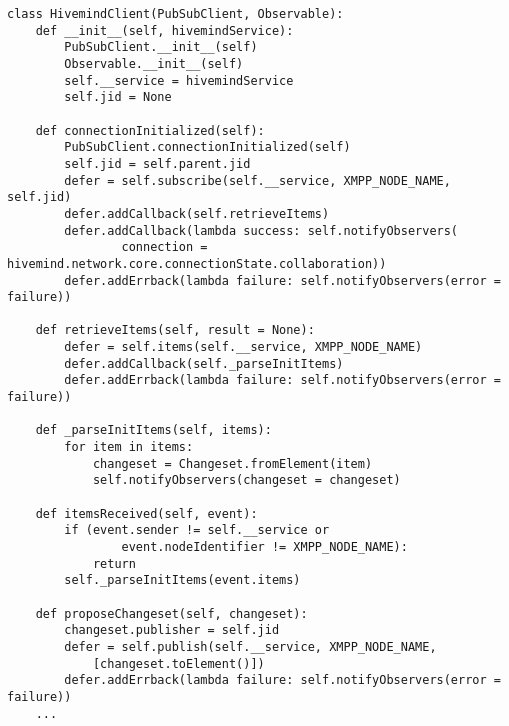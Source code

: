 \begin{lstlisting}
class HivemindClient(PubSubClient, Observable):
    def __init__(self, hivemindService):
        PubSubClient.__init__(self)
        Observable.__init__(self)
        self.__service = hivemindService
        self.jid = None

    def connectionInitialized(self):
        PubSubClient.connectionInitialized(self)
        self.jid = self.parent.jid
        defer = self.subscribe(self.__service, XMPP_NODE_NAME, self.jid)
        defer.addCallback(self.retrieveItems)
        defer.addCallback(lambda success: self.notifyObservers(
                connection = hivemind.network.core.connectionState.collaboration))
        defer.addErrback(lambda failure: self.notifyObservers(error = failure))

    def retrieveItems(self, result = None):
        defer = self.items(self.__service, XMPP_NODE_NAME)
        defer.addCallback(self._parseInitItems)
        defer.addErrback(lambda failure: self.notifyObservers(error = failure))

    def _parseInitItems(self, items):
        for item in items:
            changeset = Changeset.fromElement(item)
            self.notifyObservers(changeset = changeset)

    def itemsReceived(self, event):
        if (event.sender != self.__service or 
                event.nodeIdentifier != XMPP_NODE_NAME):
            return
        self._parseInitItems(event.items)

    def proposeChangeset(self, changeset):
        changeset.publisher = self.jid
        defer = self.publish(self.__service, XMPP_NODE_NAME,
            [changeset.toElement()]) 
        defer.addErrback(lambda failure: self.notifyObservers(error = failure))
    ...
\end{lstlisting}
